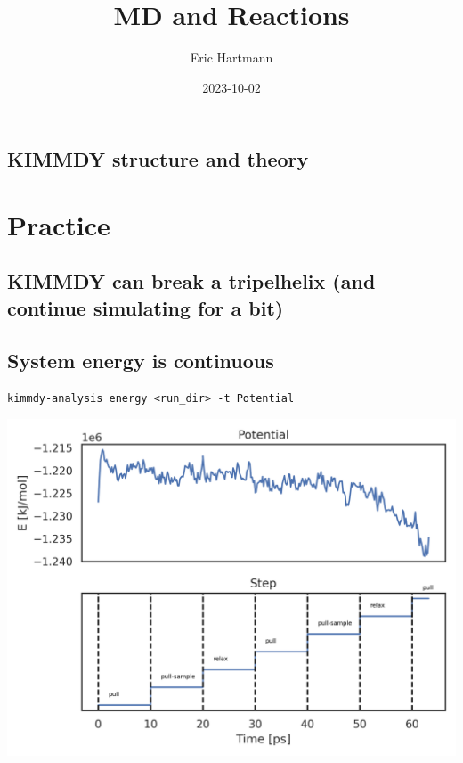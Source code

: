 \documentclass[
  letterpaper,
  DIV=11,
  numbers=noendperiod]{scrartcl}
\title{MD and Reactions}
\author{Eric Hartmann}
\date{2023-10-02}
\begin{document}
\maketitle
\ifdefined\Shaded\renewenvironment{Shaded}{\begin{tcolorbox}[frame hidden, breakable, interior hidden, sharp corners, enhanced, borderline west={3pt}{0pt}{shadecolor}, boxrule=0pt]}{\end{tcolorbox}}\fi

\hypertarget{kimmdy-structure-and-theory}{%
\subsection{KIMMDY structure and
theory}\label{kimmdy-structure-and-theory}}

\hypertarget{practice}{%
\section{Practice}\label{practice}}

\hypertarget{kimmdy-can-break-a-tripelhelix-and-continue-simulating-for-a-bit}{%
\subsection{KIMMDY can break a tripelhelix (and continue simulating for
a
bit)}\label{kimmdy-can-break-a-tripelhelix-and-continue-simulating-for-a-bit}}

\hypertarget{system-energy-is-continuous}{%
\subsection{System energy is
continuous}\label{system-energy-is-continuous}}

\texttt{kimmdy-analysis\ energy\ \textless{}run\_dir\textgreater{}\ -t\ Potential}

\includegraphics{www/tripelhelix_potential.png}
\end{document}
